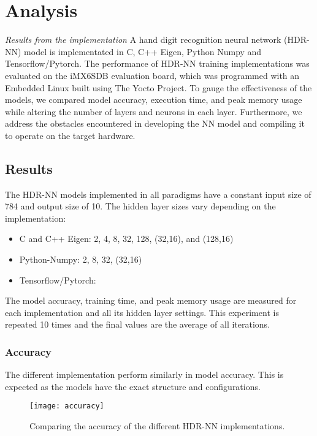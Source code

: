 \part{Analysis}
\textit{Results from the implementation}
A hand digit recognition neural network (HDR-NN) model is implementated in C, C++ Eigen, Python Numpy and Tensorflow/Pytorch. The performance of HDR-NN training implementations was evaluated on the iMX6SDB evaluation board, which was programmed with an Embedded Linux built using The Yocto Project. To gauge the effectiveness of the models, we compared model accuracy, execution time, and peak memory usage while altering the number of layers and neurons in each layer. Furthermore, we address the obstacles encountered in developing the NN model and compiling it to operate on the target hardware.


\chapter{Results}
The HDR-NN models implemented in all paradigms have a constant input size of 784 and output size of 10. The hidden layer sizes vary depending on the implementation:
\begin{itemize}
	\item C and C++ Eigen: 2, 4, 8, 32, 128, (32,16), and (128,16)
	\item Python-Numpy: 2, 8, 32, (32,16)
	\item Tensorflow/Pytorch:
\end{itemize}

The model accuracy, training time, and peak memory usage are measured for each implementation and all its hidden layer settings. This experiment is repeated 10 times and the final values are the average of all iterations.

\section{Accuracy}
The different implementation perform similarly in model accuracy. This is expected as the models have the exact structure and configurations.  
\begin{figure}[ht]
	\centering
	\texttt{[image: accuracy]}
	\caption[HDR-NN Accuracy]{Comparing the accuracy of the different HDR-NN implementations.}
\end{figure}

